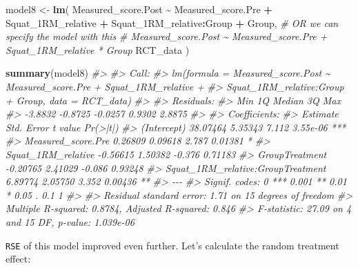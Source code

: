 \documentclass[
]{book}
\newenvironment{Shaded}{\begin{snugshade}}{\end{snugshade}}
\newcommand{\CommentTok}[1]{\textcolor[rgb]{0.56,0.35,0.01}{\textit{#1}}}
\newcommand{\KeywordTok}[1]{\textcolor[rgb]{0.13,0.29,0.53}{\textbf{#1}}}
\newcommand{\NormalTok}[1]{#1}
\newcommand{\OperatorTok}[1]{\textcolor[rgb]{0.81,0.36,0.00}{\textbf{#1}}}
\newcommand{\StringTok}[1]{\textcolor[rgb]{0.31,0.60,0.02}{#1}}
\begin{document}
\begin{Shaded}
\begin{Highlighting}[]
\NormalTok{model8 <{-}}\StringTok{ }\KeywordTok{lm}\NormalTok{(}
\NormalTok{  Measured\_score.Post }\OperatorTok{\textasciitilde{}}\StringTok{ }\NormalTok{Measured\_score.Pre }\OperatorTok{+}\StringTok{ }\NormalTok{Squat\_1RM\_relative }\OperatorTok{+}\StringTok{ }\NormalTok{Squat\_1RM\_relative}\OperatorTok{:}\NormalTok{Group }\OperatorTok{+}\StringTok{ }\NormalTok{Group,}
  \CommentTok{\# OR we can specify the model with this}
  \CommentTok{\# Measured\_score.Post \textasciitilde{} Measured\_score.Pre + Squat\_1RM\_relative * Group}
\NormalTok{  RCT\_data}
\NormalTok{)}

\KeywordTok{summary}\NormalTok{(model8)}
\CommentTok{\#> }
\CommentTok{\#> Call:}
\CommentTok{\#> lm(formula = Measured\_score.Post \textasciitilde{} Measured\_score.Pre + Squat\_1RM\_relative + }
\CommentTok{\#>     Squat\_1RM\_relative:Group + Group, data = RCT\_data)}
\CommentTok{\#> }
\CommentTok{\#> Residuals:}
\CommentTok{\#>     Min      1Q  Median      3Q     Max }
\CommentTok{\#> {-}3.8832 {-}0.8725 {-}0.0257  0.9302  2.8875 }
\CommentTok{\#> }
\CommentTok{\#> Coefficients:}
\CommentTok{\#>                                   Estimate Std. Error t value Pr(>|t|)    }
\CommentTok{\#> (Intercept)                       38.07464    5.35343   7.112 3.55e{-}06 ***}
\CommentTok{\#> Measured\_score.Pre                 0.26809    0.09618   2.787  0.01381 *  }
\CommentTok{\#> Squat\_1RM\_relative                {-}0.56615    1.50382  {-}0.376  0.71183    }
\CommentTok{\#> GroupTreatment                    {-}0.20765    2.41029  {-}0.086  0.93248    }
\CommentTok{\#> Squat\_1RM\_relative:GroupTreatment  6.89774    2.05750   3.352  0.00436 ** }
\CommentTok{\#> {-}{-}{-}}
\CommentTok{\#> Signif. codes:  0 \textquotesingle{}***\textquotesingle{} 0.001 \textquotesingle{}**\textquotesingle{} 0.01 \textquotesingle{}*\textquotesingle{} 0.05 \textquotesingle{}.\textquotesingle{} 0.1 \textquotesingle{} \textquotesingle{} 1}
\CommentTok{\#> }
\CommentTok{\#> Residual standard error: 1.71 on 15 degrees of freedom}
\CommentTok{\#> Multiple R{-}squared:  0.8784,	Adjusted R{-}squared:  0.846 }
\CommentTok{\#> F{-}statistic: 27.09 on 4 and 15 DF,  p{-}value: 1.039e{-}06}
\end{Highlighting}
\end{Shaded}

\texttt{RSE} of this model improved even further. Let's calculate the random treatment effect:
\end{document}

